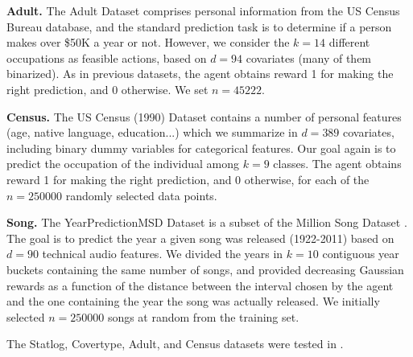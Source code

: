 \documentclass{article} \usepackage{iclr2018_conference,times}
\begin{document}
\textbf{Adult.} The Adult Dataset \citep{kohavi1996scaling, asuncion2007uci} comprises personal information from the US Census Bureau database, and the standard prediction task is to determine if a person makes over \$50K a year or not.
However, we consider the $k = 14$ different occupations as feasible actions, based on $d = 94$ covariates (many of them binarized).
As in previous datasets, the agent obtains reward 1 for making the right prediction, and 0 otherwise.
We set $n = 45222$.

\textbf{Census.} The US Census (1990) Dataset \citep{asuncion2007uci} contains a number of personal features (age, native language, education...) which we summarize in $d = 389$ covariates, including binary dummy variables for categorical features. Our goal again is to predict the occupation of the individual among $k = 9$ classes.
The agent obtains reward 1 for making the right prediction, and 0 otherwise, for each of the $n = 250000$ randomly selected data points.

\textbf{Song.} The YearPredictionMSD Dataset is a subset of the Million Song Dataset \citep{Bertin-Mahieux2011}.
The goal is to predict the year a given song was released (1922-2011) based on $d = 90$ technical audio features.
We divided the years in $k = 10$ contiguous year buckets containing the same number of songs, and provided decreasing Gaussian rewards as a function of the distance between the interval chosen by the agent and the one containing the year the song was actually released.
We initially selected $n = 250000$ songs at random from the training set.

The Statlog, Covertype, Adult, and Census datasets were tested in \cite{elmachtoub2017practical}.
 
\end{document}
